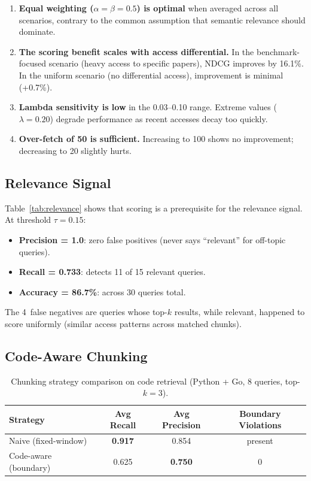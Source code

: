 \documentclass[11pt,a4paper]{article}
\begin{document}
\begin{enumerate}
  \item \textbf{Equal weighting ($\alpha{=}\beta{=}0.5$) is optimal}
    when averaged across all scenarios, contrary to the common
    assumption that semantic relevance should dominate.
  \item \textbf{The scoring benefit scales with access differential.}
    In the benchmark-focused scenario (heavy access to specific
    papers), NDCG improves by 16.1\%.  In the uniform scenario (no
    differential access), improvement is minimal (+0.7\%).
  \item \textbf{Lambda sensitivity is low} in the 0.03--0.10 range.
    Extreme values ($\lambda = 0.20$) degrade performance as
    recent accesses decay too quickly.
  \item \textbf{Over-fetch of 50 is sufficient.}  Increasing to 100
    shows no improvement; decreasing to 20 slightly hurts.
\end{enumerate}

\subsection{Relevance Signal}

Table~\ref{tab:relevance} shows that scoring is a prerequisite for the
relevance signal.  At threshold $\tau = 0.15$:

\begin{itemize}
  \item \textbf{Precision = 1.0}: zero false positives (never says
    ``relevant'' for off-topic queries).
  \item \textbf{Recall = 0.733}: detects 11 of 15 relevant queries.
  \item \textbf{Accuracy = 86.7\%}: across 30 queries total.
\end{itemize}

The 4~false negatives are queries whose top-$k$ results, while
relevant, happened to score uniformly (similar access patterns
across matched chunks).

\subsection{Code-Aware Chunking}

\begin{table}[t]
  \centering
  \caption{Chunking strategy comparison on code retrieval
    (Python + Go, 8 queries, top-$k{=}3$).}
  \label{tab:chunking}
  \begin{tabular}{lccc}
    \toprule
    Strategy & Avg Recall & Avg Precision & Boundary Violations \\
    \midrule
    Naive (fixed-window)  & \textbf{0.917} & 0.854 & present \\
    Code-aware (boundary) & 0.625 & \textbf{0.750} & 0 \\
    \bottomrule
  \end{tabular}
\end{table}
\end{document}
